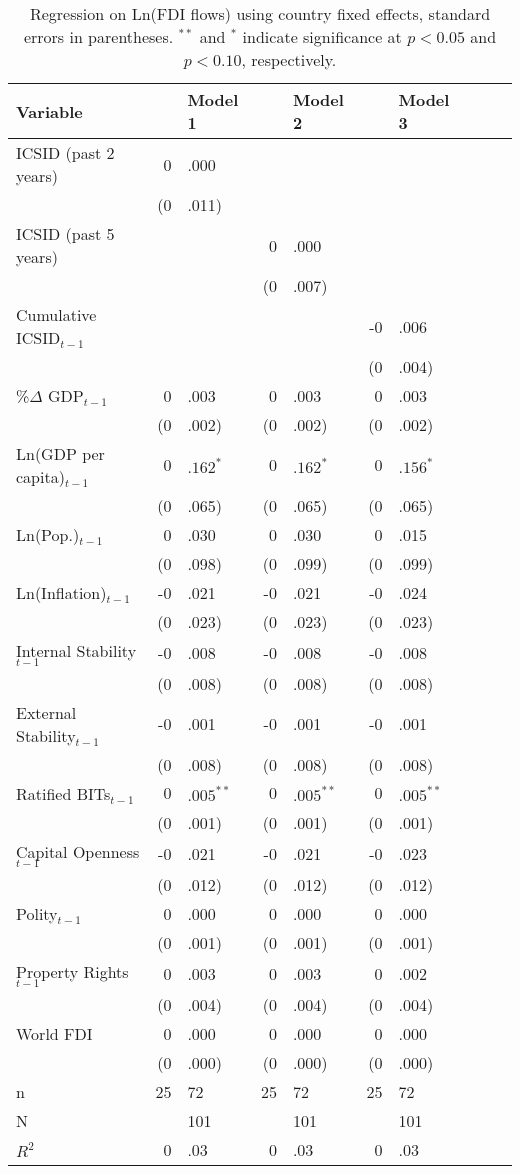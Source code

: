 \documentclass[12pt,onesided]{amsart}
\begin{document}
\begin{table}[ht]
\centering
\caption{Regression on Ln(FDI flows) using country fixed effects, standard errors in parentheses. $^{**}$ and $^{*}$ indicate significance at $p< 0.05 $ and $p< 0.10 $, respectively.} 
\label{tab:dispFDI}
{\footnotesize
\begin{tabular}{lr@{} lr@{}lr@{}lr@{}lr@{}}
 Variable && Model 1 && Model 2 && Model 3 \\ 
  \hline
\hline
ICSID (past 2 years) & 0&.000 &&  &&  \\ 
   & (0&.011) &&  &&  \\ 
  ICSID (past 5 years) &&  & 0&.000 &&  \\ 
   &&  & (0&.007) &&  \\ 
  Cumulative ICSID$_{t-1}$ &&  &&  & -0&.006 \\ 
   &&  &&  & (0&.004) \\ 
  \%$\Delta$ GDP$_{t-1}$ & 0&.003 & 0&.003 & 0&.003 \\ 
   & (0&.002) & (0&.002) & (0&.002) \\ 
  Ln(GDP per capita)$_{t-1}$ & $0$&$.162^{\ast}$ & $0$&$.162^{\ast}$ & $0$&$.156^{\ast}$ \\ 
   & (0&.065) & (0&.065) & (0&.065) \\ 
  Ln(Pop.)$_{t-1}$ & 0&.030 & 0&.030 & 0&.015 \\ 
   & (0&.098) & (0&.099) & (0&.099) \\ 
  Ln(Inflation)$_{t-1}$ & -0&.021 & -0&.021 & -0&.024 \\ 
   & (0&.023) & (0&.023) & (0&.023) \\ 
  Internal Stability$_{t-1}$ & -0&.008 & -0&.008 & -0&.008 \\ 
   & (0&.008) & (0&.008) & (0&.008) \\ 
  External Stability$_{t-1}$ & -0&.001 & -0&.001 & -0&.001 \\ 
   & (0&.008) & (0&.008) & (0&.008) \\ 
  Ratified BITs$_{t-1}$ & $0$&$.005^{\ast\ast}$ & $0$&$.005^{\ast\ast}$ & $0$&$.005^{\ast\ast}$ \\ 
   & (0&.001) & (0&.001) & (0&.001) \\ 
  Capital Openness$_{t-1}$ & -0&.021 & -0&.021 & -0&.023 \\ 
   & (0&.012) & (0&.012) & (0&.012) \\ 
  Polity$_{t-1}$ & 0&.000 & 0&.000 & 0&.000 \\ 
   & (0&.001) & (0&.001) & (0&.001) \\ 
  Property Rights$_{t-1}$ & 0&.003 & 0&.003 & 0&.002 \\ 
   & (0&.004) & (0&.004) & (0&.004) \\ 
  World FDI & 0&.000 & 0&.000 & 0&.000 \\ 
   & (0&.000) & (0&.000) & (0&.000) \\ 
   \hline
n & 25&72 & 25&72 & 25&72 \\ 
  N && 101 && 101 && 101 \\ 
  $R^{2}$ & 0&.03 & 0&.03 & 0&.03 \\ 
   \hline
\hline
\end{tabular}
}
\end{table}
\end{document}
